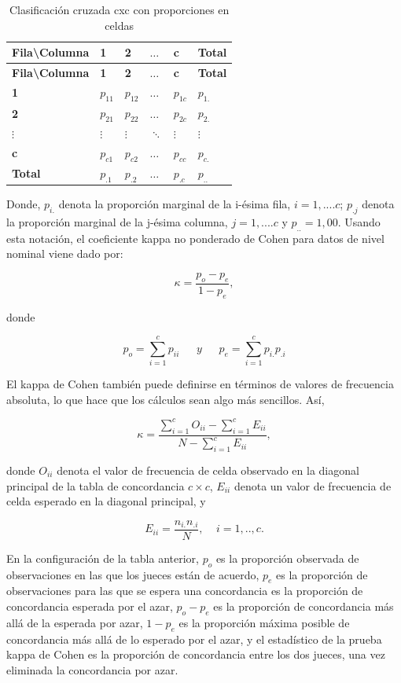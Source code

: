 \documentclass[12pt,a4paper,]{book}
\numberwithin{dummy}{section}
\theoremstyle{ocrenumbox}
\theoremstyle{blacknumex}
\theoremstyle{blacknumbox}
\theoremstyle{ocrenum}
\theoremstyle{ocrenum}
\begin{document}
\begin{longtable}[]{@{}llllll@{}}
\caption{Clasificación cruzada cxc con proporciones en
celdas}\tabularnewline
\toprule
\textbf{Fila\textbackslash Columna} & \textbf{1} & \textbf{2} &
\(\dots\) & \textbf{c} & \textbf{Total} \\
\midrule
\endfirsthead
\toprule
\textbf{Fila\textbackslash Columna} & \textbf{1} & \textbf{2} &
\(\dots\) & \textbf{c} & \textbf{Total} \\
\midrule
\endhead
\textbf{1} & \(p_{11}\) & \(p_{12}\) & \(\dots\) & \(p_{1c}\) &
\(p_{1.}\) \\
\textbf{2} & \(p_{21}\) & \(p_{22}\) & \(\dots\) & \(p_{2c}\) &
\(p_{2.}\) \\
\(\vdots\) & \(\vdots\) & \(\vdots\) & \(\ddots\) & \(\vdots\) &
\(\vdots\) \\
\textbf{c} & \(p_{c1}\) & \(p_{c2}\) & \(\dots\) & \(p_{cc}\) &
\(p_{c.}\) \\
\textbf{Total} & \(p_{.1}\) & \(p_{.2}\) & \(\dots\) & \(p_{.c}\) &
\(p_{..}\) \\
\bottomrule
\end{longtable}

Donde, \(p_{i.}\) denota la proporción marginal de la i-ésima fila,
\(i = 1, . . . . c\); \(p_{.j}\) denota la proporción marginal de la
j-ésima columna, \(j = 1, . . . . c\) y \(p_{..} = 1,00\). Usando esta
notación, el coeficiente kappa no ponderado de Cohen para datos de nivel
nominal viene dado por:

\[
\kappa=\frac{p_o-p_e}{1-p_e},
\]

donde

\[
p_o=\sum_{i=1}^cp_{ii} ~~~~~~~ y ~~~~~~~ p_e=\sum_{i=1}^c
p_{i.}p_{.i}\]

El kappa de Cohen también puede definirse en términos de valores de
frecuencia absoluta, lo que hace que los cálculos sean algo más
sencillos. Así,

\[
\kappa=\frac{\displaystyle\sum_{i=1}^cO_{ii}-\displaystyle\sum_{i=1}^cE_{ii}}{N-\displaystyle\sum_{i=1}^cE_{ii}},
\]

donde \(O_{ii}\) denota el valor de frecuencia de celda observado en la
diagonal principal de la tabla de concordancia \(c\times c\), \(E_{ii}\)
denota un valor de frecuencia de celda esperado en la diagonal
principal, y

\[
E_{ii}=\frac{n_{i.}n_{.i}}{N}, ~~~~~i=1,..,c .
\]

En la configuración de la tabla anterior, \(p_o\) es la proporción
observada de observaciones en las que los jueces están de acuerdo,
\(p_e\) es la proporción de observaciones para las que se espera una
concordancia es la proporción de concordancia esperada por el azar,
\(p_o -p_e\) es la proporción de concordancia más allá de la esperada
por azar, \(1 - p_e\) es la proporción máxima posible de concordancia
más allá de lo esperado por el azar, y el estadístico de la prueba kappa
de Cohen es la proporción de concordancia entre los dos jueces, una vez
eliminada la concordancia por azar.
\end{document}

